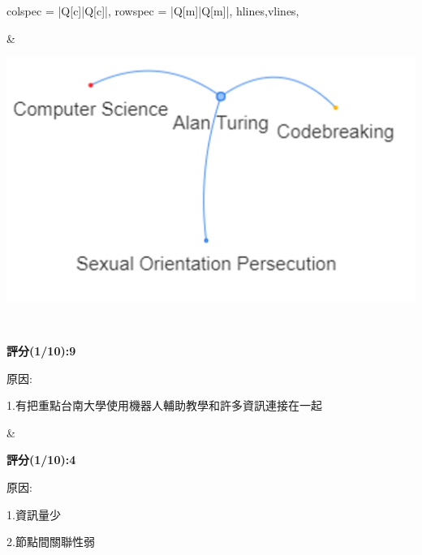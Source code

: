 \begin{longtblr}[
    caption = {臺南大學AI機器人場域驗證影片和艾倫圖靈的故事文本內容及知識圖},
]{
    colspec = {|Q[c]|Q[c]|},
    rowspec = {|Q[m]|Q[m]|},
    hlines,vlines,
}
\begin{minipage}[t][5cm][b]{0.3\textwidth}
            \setcounter{figure}{0} %
            \captionsetup{font=scriptsize}
\end{minipage}  &  
\begin{minipage}[t][5cm][b]{0.3\textwidth}
            \centering
            \includegraphics[width=\textwidth]{images/w2/w2_taide_2.png}\\
            \setcounter{figure}{1} 
            \captionsetup{font=scriptsize}
        \end{minipage} \\
\begin{minipage}[t]{0.4\textwidth}
            \centering
            \small \textbf{評分(1/10):9} \\
            \raggedright
            \small 原因: \par 1.有把重點台南大學使用機器人輔助教學和許多資訊連接在一起
            \vspace{5pt}
\end{minipage}  &  
\begin{minipage}[t]{0.4\textwidth}
            \centering
            \small \textbf{評分(1/10):4} \\
            \raggedright
            \small 原因: \par 1.資訊量少\par2.節點間關聯性弱
\end{minipage} \\
\begin{minipage}[t][5cm][b]{0.3\textwidth}
            \centering

\end{minipage}
\end{longtblr}
